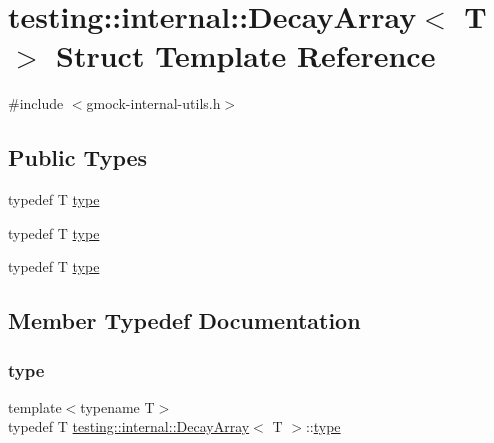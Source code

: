 \hypertarget{structtesting_1_1internal_1_1_decay_array}{}\section{testing\+::internal\+::Decay\+Array$<$ T $>$ Struct Template Reference}
\label{structtesting_1_1internal_1_1_decay_array}


{\ttfamily \#include $<$gmock-\/internal-\/utils.\+h$>$}

\subsection*{Public Types}
\begin{DoxyCompactItemize}
\item 
typedef T \mbox{\hyperlink{structtesting_1_1internal_1_1_decay_array_a39803f9bafd56bc4531f86eb34fe9c0f}{type}}
\item 
typedef T \mbox{\hyperlink{structtesting_1_1internal_1_1_decay_array_a39803f9bafd56bc4531f86eb34fe9c0f}{type}}
\item 
typedef T \mbox{\hyperlink{structtesting_1_1internal_1_1_decay_array_a39803f9bafd56bc4531f86eb34fe9c0f}{type}}
\end{DoxyCompactItemize}


\subsection{Member Typedef Documentation}
\mbox{\label{structtesting_1_1internal_1_1_decay_array_a39803f9bafd56bc4531f86eb34fe9c0f}} 
\subsubsection{\texorpdfstring{type}{type}\hspace{0.1cm}{\footnotesize\ttfamily [1/3]}}
{\footnotesize\ttfamily template$<$typename T$>$ \\
typedef T \mbox{\hyperlink{structtesting_1_1internal_1_1_decay_array}{testing\+::internal\+::\+Decay\+Array}}$<$ T $>$\+::\mbox{\hyperlink{structtesting_1_1internal_1_1_decay_array_a39803f9bafd56bc4531f86eb34fe9c0f}{type}}}

